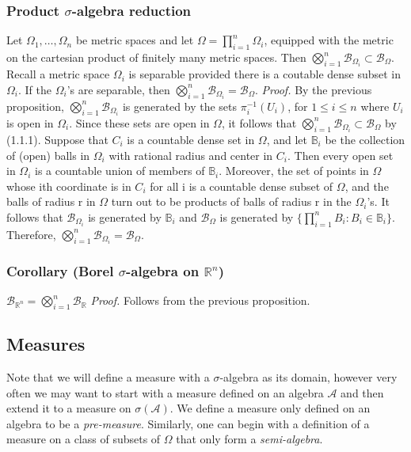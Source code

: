\documentclass{article}
\begin{document}
\subsubsection{Product $\sigma$-algebra reduction}
Let $\Omega_1,\ldots,\Omega_n$ be metric spaces and let $\Omega=\prod_{i=1}^n\Omega_i$, equipped with the metric on the cartesian product of finitely many metric spaces. Then $\bigotimes_{i=1}^n\mathcal{B}_{\Omega_i}\subset\mathcal{B}_{\Omega}$. Recall a metric space $\Omega_i$ is separable provided there is a coutable dense subset in $\Omega_i$. If the $\Omega_i$'s are separable, then $\bigotimes_{i=1}^n\mathcal{B}_{\Omega_i}= \mathcal{B}_{\Omega}$.\newline \newline
\textit{Proof.}\newline \newline
By the previous proposition, $\bigotimes_{i=1}^n\mathcal{B}_{\Omega_i}$ is generated by the sets $\pi_i^{-1}(U_i)$, for $1\leq i \leq n$ where $U_i$ is open in $\Omega_i$. Since these sets are open in $\Omega$, it follows that  $\bigotimes_{i=1}^n\mathcal{B}_{\Omega_i}\subset\mathcal{B}_{\Omega}$ by (1.1.1). Suppose that $C_i$ is a countable dense set in $\Omega$, and let $\mathbb{B}_i$ be the collection of (open) balls in $\Omega_i$ with rational radius and center in $C_i$. Then every open set in $\Omega_i$ is a countable union of members of $\mathbb{B}_i$. Moreover, the set of points in $\Omega$ whose ith coordinate is in $C_i$ for all i is a countable dense subset of $\Omega$, and the balls of radius r in $\Omega$ turn out to be products of balls of radius r in the $\Omega_i$'s. It follows that $\mathcal{B}_{\Omega_i}$ is generated by $\mathbb{B}_i$ and $\mathcal{B}_{\Omega}$ is generated by $\{\prod_{i=1}^nB_i:B_i\in\mathbb{B}_i\}$. Therefore, $\bigotimes_{i=1}^n\mathcal{B}_{\Omega_i}=\mathcal{B}_{\Omega}$.

\subsubsection{Corollary (Borel $\sigma$-algebra on $\mathbb{R}^n$)}
$\mathcal{B}_{\mathbb{R}^n}=\bigotimes_{i=1}^n\mathcal{B}_{\mathbb{R}}$\newline \newline
\textit{Proof.}\newline \newline
Follows from the previous proposition.

\subsection{Measures}
Note that we will define a measure with a $\sigma$-algebra as its domain, however very often we may want to start with a measure defined on an algebra $\mathcal{A}$ and then extend it to a measure on $\sigma(\mathcal{A})$. We define a measure only defined on an algebra to be a \emph{pre-measure}. Similarly, one can begin with a definition of a measure on a class of subsets of $\Omega$ that only form a \emph{semi-algebra}.
\end{document}
